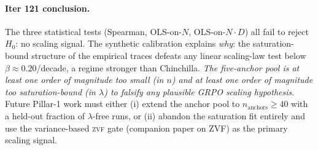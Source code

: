 \paragraph{Iter 121 conclusion.}
\label{par:scaling-iter121-conclusion}
The three statistical tests (Spearman, OLS-on-$N$, OLS-on-$N \cdot D$)
all fail to reject $H_0$: no scaling signal.  The synthetic
calibration explains \emph{why}: the saturation-bound structure of
the empirical traces defeats any linear scaling-law test below
$\beta \approx 0.20$/decade, a regime stronger than Chinchilla.
\emph{The five-anchor pool is at least one order of magnitude too
small (in $n$) and at least one order of magnitude too
saturation-bound (in $\lambda$) to falsify any plausible GRPO
scaling hypothesis}.  Future Pillar-1 work must either (i) extend
the anchor pool to $n_{\text{anchors}} \ge 40$ with a held-out
fraction of $\lambda$-free runs, or (ii) abandon the saturation
fit entirely and use the variance-based \textsc{zvf} gate
(companion paper on ZVF) as the primary scaling signal.

\begin{table}[t]
  \centering
  \small
  \caption{\textbf{Iter 121 detection-power calibration.}
    Three independent statistical tests on the five-anchor pool
    all fail to reject $H_0$ of no scaling signal.  The synthetic
    calibration makes the degeneracy explicit: at the empirical
    noise level ($\sigma = 0.189$) and saturation-bound fraction
    ($80\%$), no linear scaling law on $R_{\max}$ with
    $\beta \le 0.20$/decade is recoverable.  Scripts:
    \texttt{scripts/scaling\_law\_iter121.py} $\to$
    \texttt{scaling\_law\_iter121\_late\_early.tsv},
    \texttt{scaling\_law\_iter121\_effective\_compute.tsv},
    \texttt{scaling\_law\_iter121\_synthetic\_recovery.tsv},
    \texttt{scaling\_law\_iter121\_power\_curve.tsv}.}
  \label{tab:scaling-iter121}
\end{table}

